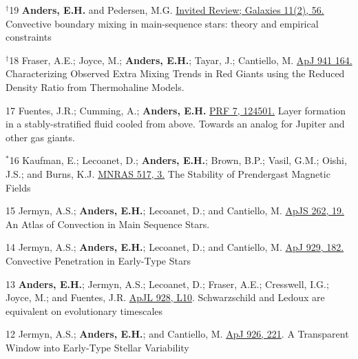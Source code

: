 \cvpub{}
      {$^{\dagger}$19}
      {
        \textbf{Anders, E.H.} and Pedersen, M.G. 
        \href{https://www.mdpi.com/2075-4434/11/2/56}{Invited Review; Galaxies 11(2), 56.}
      }
      {Convective boundary mixing in main-sequence stars: theory and empirical constraints}




      {$^\dagger$18}
      {
        Fraser, A.E.; Joyce, M.; \textbf{Anders, E.H.}; Tayar, J.; Cantiello, M. 
        \href{https://iopscience.iop.org/article/10.3847/1538-4357/aca024}{ApJ 941 164.}
      }
      {Characterizing Observed Extra Mixing Trends in Red Giants using the Reduced Density Ratio from Thermohaline Models.}

\cvpub{}
      {17}
      {
        Fuentes, J.R.; Cumming, A.; \textbf{Anders, E.H.}
        \href{https://journals.aps.org/prfluids/abstract/10.1103/PhysRevFluids.7.124501}{PRF 7, 124501.}
      }
      {Layer formation in a stably-stratified fluid cooled from above. Towards an analog for Jupiter and other gas giants.}


\cvpub{}
      {$^*$16}
      {
        Kaufman, E.; Lecoanet, D.; \textbf{Anders, E.H.}; Brown, B.P.; Vasil, G.M.; Oishi, J.S.; and Burns, K.J.
        \href{https://academic.oup.com/mnras/article/517/3/3332/6748231?login=true}{MNRAS 517, 3.}
      }
      {The Stability of Prendergast Magnetic Fields}

\cvpub{}
	  {15}
	  {
		Jermyn, A.S.; \textbf{Anders, E.H.}; Lecoanet, D.; and Cantiello, M.
        \href{https://iopscience.iop.org/article/10.3847/1538-4365/ac7cee}{ApJS 262, 19.}
       }
	  {An Atlas of Convection in Main Sequence Stars.}

\cvpub{}
	  {14}
	  {
		Jermyn, A.S.; \textbf{Anders, E.H.}; Lecoanet, D.; and Cantiello, M. 
        \href{https://iopscience.iop.org/article/10.3847/1538-4357/ac5f08}{ApJ 929, 182.}
	  }
	  {Convective Penetration in Early-Type Stars}

\cvpub{}
	  {13}
	  {
		\textbf{Anders, E.H.}; Jermyn, A.S.; Lecoanet, D.; Fraser, A.E.; Cresswell, I.G.; Joyce, M.; and Fuentes, J.R. 
        \href{https://iopscience.iop.org/article/10.3847/2041-8213/ac5cb5}{ApJL 928, L10}.
	  }
	  {Schwarzschild and Ledoux are equivalent on evolutionary timescales}

\cvpub{}
	  {12}
	  {
		Jermyn, A.S.; \textbf{Anders, E.H.}; and Cantiello, M. 
        \href{https://iopscience.iop.org/article/10.3847/1538-4357/ac4e89}{ApJ 926, 221}.
	  }
	  {A Transparent Window into Early-Type Stellar Variability}

